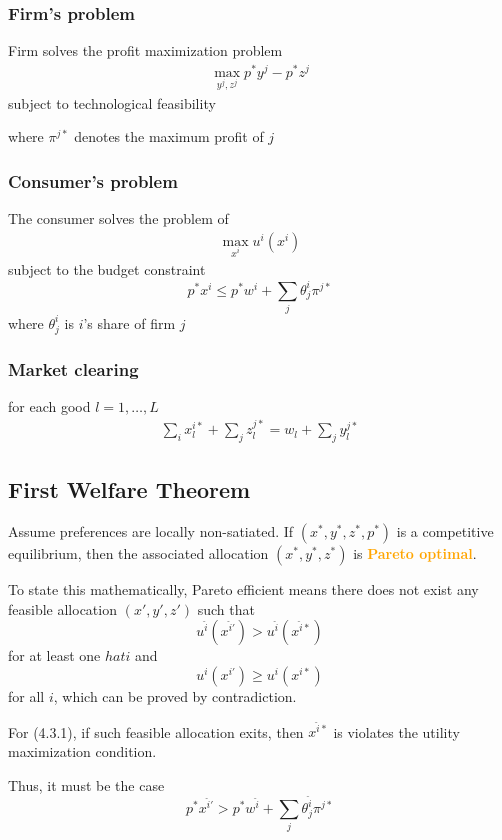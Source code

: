 \documentclass[twocolumn, fleqn]{article}
\begin{document}
		\subsubsection{Firm's problem}
		Firm solves the profit maximization problem
		\begin{align*}
			\max_{y^j, z^j} p^\ast y^j - p^\ast z^j
		\end{align*}
		subject to technological feasibility
		
		where $\pi^{j \ast}$ denotes the maximum profit of $j$
		
		\subsubsection{Consumer's problem}
		The consumer solves the problem of 
		\begin{align*}
			\max_{x^i} u^i(x^i)
		\end{align*}
		subject to the budget constraint
		\[p^\ast x^i \leq p^\ast w^i +\sum_j \theta_j^i \pi^{j\ast}\]
		where $\theta_j^i$ is $i$'s share of firm $j$
		
		\subsubsection{Market clearing}
		for each good $l = 1, \ldots, L$
		\begin{align*}
			\sum_i x_l^{i\ast} + \sum_j z_l^{j \ast} = w_l + \sum_j y_l^{j \ast}
		\end{align*}
		
		\subsection{First Welfare Theorem}
		Assume preferences are locally non-satiated. If \((x^*, y^*, z^*, p^*)\) is a competitive equilibrium, then the associated allocation \((x^*, y^*, z^*)\) is \textcolor{orange}{\textbf{Pareto optimal}}.
		
		To state this mathematically, Pareto efficient means there does not exist any feasible allocation $(x', y', z')$ such that 
		\[ u^{\hat{i}}(x^{\hat{i}'}) > u^{\hat{i}}(x^{\hat{i}\ast}) \tag{4.3.1}\]
		for at least one $hat{i}$ and
		\[ u^i(x^{i'}) \geq u^i(x^{i\ast}) \tag{4.3.2}\]
		for all $i$, which can be proved by contradiction.
		
		For (4.3.1), if such feasible allocation exits, then $x^{\hat{i}\ast}$ is violates the utility maximization condition.
		
		Thus, it must be the case 
		\[p^\ast x^{\hat{i}'}> p^\ast w^{\hat{i}} +\sum_j \theta_j^{\hat{i}} \pi^{j\ast} \tag{4.3.3}\]
		
\end{document}
